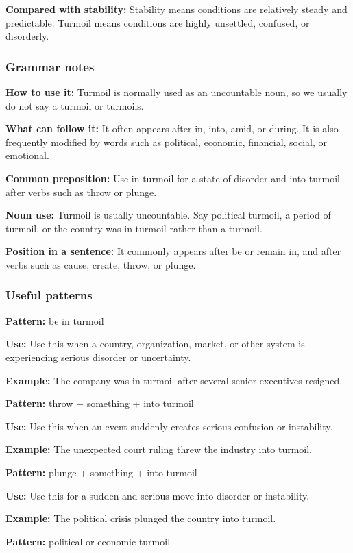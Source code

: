 \documentclass[11pt]{article}
\begin{document}
\textbf{Compared with stability:} Stability means conditions are relatively steady and predictable. Turmoil means conditions are highly unsettled, confused, or disorderly.

\subsubsection{Grammar notes}
\textbf{How to use it:} Turmoil is normally used as an uncountable noun, so we usually do not say a turmoil or turmoils.

\textbf{What can follow it:} It often appears after in, into, amid, or during. It is also frequently modified by words such as political, economic, financial, social, or emotional.

\textbf{Common preposition:} Use in turmoil for a state of disorder and into turmoil after verbs such as throw or plunge.

\textbf{Noun use:} Turmoil is usually uncountable. Say political turmoil, a period of turmoil, or the country was in turmoil rather than a turmoil.

\textbf{Position in a sentence:} It commonly appears after be or remain in, and after verbs such as cause, create, throw, or plunge.

\subsubsection{Useful patterns}
\textbf{Pattern:} be in turmoil

\textbf{Use:} Use this when a country, organization, market, or other system is experiencing serious disorder or uncertainty.

\textbf{Example:} The company was in turmoil after several senior executives resigned.

\textbf{Pattern:} throw + something + into turmoil

\textbf{Use:} Use this when an event suddenly creates serious confusion or instability.

\textbf{Example:} The unexpected court ruling threw the industry into turmoil.

\textbf{Pattern:} plunge + something + into turmoil

\textbf{Use:} Use this for a sudden and serious move into disorder or instability.

\textbf{Example:} The political crisis plunged the country into turmoil.

\textbf{Pattern:} political or economic turmoil
\end{document}

